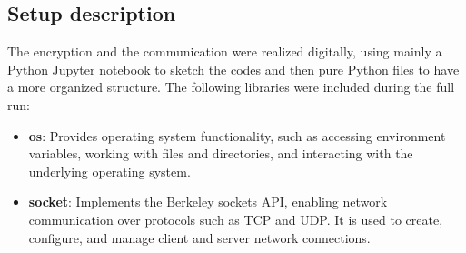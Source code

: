 \subsection{Setup description}
The encryption and the communication were realized digitally, using
mainly a Python Jupyter notebook to sketch the codes and then
pure Python files to have a more organized structure.
The following libraries were included during the full run:
\begin{itemize}
  \item \textbf{os}: Provides operating system functionality, such as
    accessing environment variables, working with files and
    directories, and interacting with the underlying operating system.
  \item \textbf{socket}: Implements the Berkeley sockets API,
    enabling network communication over protocols such as TCP and
    UDP. It is used to create, configure, and manage client and
    server network connections.
\end{itemize}
